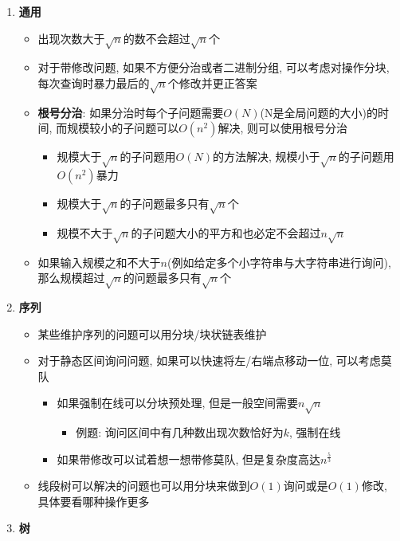 \begin{enumerate}

\item \textbf{通用}

\begin{itemize}
	\item 出现次数大于$\sqrt n$的数不会超过$\sqrt n$个
	\item 对于带修改问题, 如果不方便分治或者二进制分组, 可以考虑对操作分块, 每次查询时暴力最后的$\sqrt n$个修改并更正答案
	\item \textbf{根号分治}: 如果分治时每个子问题需要$O(N)$(N是全局问题的大小)的时间, 而规模较小的子问题可以$O(n^2)$解决, 则可以使用根号分治
		\begin{itemize}
			\item 规模大于$\sqrt n$的子问题用$O(N)$的方法解决, 规模小于$\sqrt n$的子问题用$O(n^2)$暴力
			\item 规模大于$\sqrt n$的子问题最多只有$\sqrt n$个
			\item 规模不大于$\sqrt n$的子问题大小的平方和也必定不会超过$n\sqrt n$
		\end{itemize}
	\item 如果输入规模之和不大于$n$(例如给定多个小字符串与大字符串进行询问), 那么规模超过$\sqrt n$的问题最多只有$\sqrt n$个
\end{itemize}

\item \textbf{序列}

\begin{itemize}
	\item 某些维护序列的问题可以用分块/块状链表维护
	\item 对于静态区间询问问题, 如果可以快速将左/右端点移动一位, 可以考虑莫队
		\begin{itemize}
			\item 如果强制在线可以分块预处理, 但是一般空间需要$n\sqrt n$ 
				\begin{itemize}
					\item 例题: 询问区间中有几种数出现次数恰好为$k$, 强制在线
				\end{itemize}
			\item 如果带修改可以试着想一想带修莫队, 但是复杂度高达$n^{\frac 5 3}$
		\end{itemize}
	\item 线段树可以解决的问题也可以用分块来做到$O(1)$询问或是$O(1)$修改, 具体要看哪种操作更多
\end{itemize}

\item \textbf{树}


\end{enumerate}
